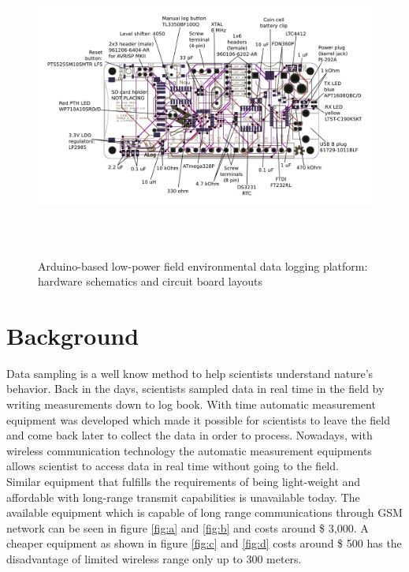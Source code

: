 \begin{figure}
\centering
\includegraphics[height=10cm]{graphics/ALog_drawing}
\caption{Arduino-based low-power field environmental data logging platform: hardware schematics and circuit board layouts\label{fig:BottleLog}\cite{ALog-BottleLogger}}
\end{figure}

\section{Background}
Data sampling is a well know method to help scientists understand nature's behavior. Back in the days, scientists sampled data in real time in the field by writing measurements down to log book. With time automatic measurement equipment was developed which made it possible for scientists to leave the field and come back later to collect the data in order to process. Nowadays, with wireless communication technology the automatic measurement equipments allows scientist to access data in real time without going to the field.\\
Similar equipment that fulfills the requirements of being light-weight and affordable with long-range transmit capabilities is unavailable today. The available equipment which is capable of long range communications through GSM network can be seen in figure \ref{fig:a} and \ref{fig:b} and costs around \$ 3,000. A cheaper equipment as shown in figure \ref{fig:c} and  \ref{fig:d} costs around \$ 500 has the disadvantage of limited wireless range only up to 300 meters.

